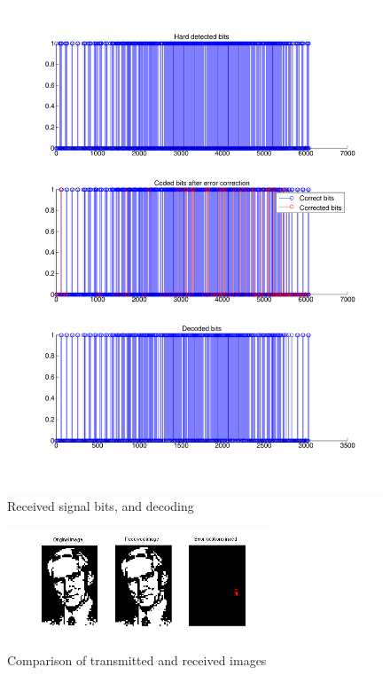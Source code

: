 \documentclass[11pt]{scrartcl}
\begin{document}
\begin{figure}
    \centering
    \includegraphics[width=1.0\textwidth]{figures/receivedbits.pdf}
    \caption{Received signal bits, and decoding}
\end{figure}

\begin{figure}
    \centering
    \includegraphics[width=0.7\textwidth]{figures/receivedimage.png}
    \caption{Comparison of transmitted and received images}
\end{figure}
\end{document}
